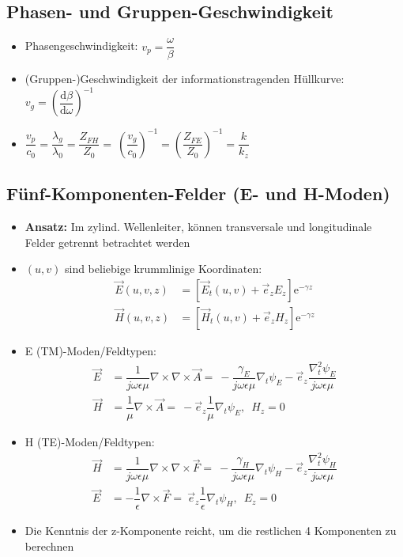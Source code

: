 \subsection{Phasen- und Gruppen-Geschwindigkeit}
\begin{itemize}
    \itemsep0pt
    \item Phasengeschwindigkeit: \(v_p = \dfrac{\omega}{\beta}\)
    \item (Gruppen-)Geschwindigkeit der informationstragenden Hüllkurve:\\
        \(v_g = \left( \dfrac{\mathrm{d}\beta}{\mathrm{d}\omega} \right)^{-1}\)
    \item \(\dfrac{v_p}{c_0} =  \dfrac{\lambda_g}{\lambda_0} = \dfrac{Z_{FH}}{Z_0} =\
        \left(\dfrac{v_g}{c_0}\right)^{-1} = \left(\dfrac{Z_{FE}}{Z_0}\right)^{-1} = \dfrac{k}{k_z}\)
\end{itemize}
\subsection{Fünf-Komponenten-Felder (E- und H-Moden)}
\begin{itemize}
    \itemsep0pt
    \item \textbf{Ansatz:} Im zylind. Wellenleiter, können transversale und longitudinale Felder getrennt betrachtet werden
    \item \((u,v)\) sind beliebige krummlinige Koordinaten:
        \begin{align*}
            \vec{E}(u, v, z) &= \left[ \vec{E}_t(u,v) + \vec{e}_z E_z \right]\mathrm{e}^{-\gamma z}\\
            \vec{H}(u, v, z) &= \left[ \vec{H}_t(u,v) + \vec{e}_z H_z \right]\mathrm{e}^{-\gamma z}
        \end{align*}
    \item E (TM)-Moden/Feldtypen:
        \begin{align*}
            \vec{E} &= \dfrac{1}{j\omega\epsilon\mu} \nabla\times\nabla\times\vec{A} =\
            -\dfrac{\gamma_E}{j\omega\epsilon\mu}\nabla_t \psi_E - \vec{e}_z \dfrac{\nabla_t^2\psi_E}{j\omega\epsilon\mu}\\
            \vec{H} &= \dfrac{1}{\mu} \nabla\times\vec{A} =\
            - \vec{e}_z \dfrac{1}{\mu}\nabla_t \psi_E,\;\
            H_z = 0
        \end{align*}
    \item H (TE)-Moden/Feldtypen:
        \begin{align*}
             \vec{H} &= \dfrac{1}{j\omega\epsilon\mu} \nabla\times\nabla\times\vec{F} =\
            -\dfrac{\gamma_H}{j\omega\epsilon\mu}\nabla_t \psi_H - \vec{e}_z \dfrac{\nabla_t^2\psi_H}{j\omega\epsilon\mu}\\
            \vec{E} &= -\dfrac{1}{\epsilon} \nabla\times\vec{F} =\
            \vec{e}_z \dfrac{1}{\epsilon}\nabla_t \psi_H,\;\
            E_z = 0
        \end{align*}
    \item Die Kenntnis der z-Komponente reicht, um die restlichen 4 Komponenten zu berechnen
\end{itemize}

